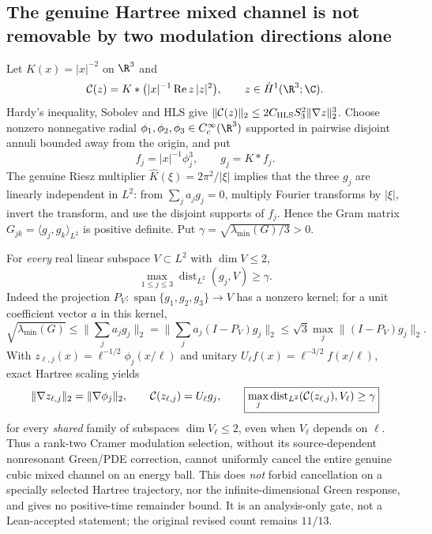 \subsection*{The genuine Hartree mixed channel is not removable by two modulation directions alone}

Let \(K(x)=|x|^{-2}\) on \(\R^3\) and
\[
 {\cal C}(z)=K*\bigl(|x|^{-1}\operatorname{Re}z\,|z|^2\bigr),
 \qquad z\in\dot H^1(\R^3;\C).
\]
Hardy's inequality, Sobolev and HLS give
\(\|{\cal C}(z)\|_2\le 2C_{\rm HLS}S_3^2\|\nabla z\|_2^3\).
Choose nonzero nonnegative radial \(\phi_1,\phi_2,\phi_3\in C_c^\infty(\R^3)\)
supported in pairwise disjoint annuli bounded away from the origin, and put
\[
 f_j=|x|^{-1}\phi_j^3,\qquad g_j=K*f_j.
\]
The genuine Riesz multiplier \(\widehat K(\xi)=2\pi^2/|\xi|\)
implies that the three \(g_j\) are linearly independent in \(L^2\):
from \(\sum_j a_jg_j=0\), multiply Fourier transforms by \(|\xi|\),
invert the transform, and use the disjoint supports of \(f_j\).
Hence the Gram matrix \(G_{jk}=\langle g_j,g_k\rangle_{L^2}\)
is positive definite. Put \(\gamma=\sqrt{\lambda_{\min}(G)/3}>0\).

For \emph{every} real linear subspace \(V\subset L^2\) with \(\dim V\le2\),
\[
 \boxed{\max_{1\le j\le3}\operatorname{dist}_{L^2}(g_j,V)\ge\gamma.}
\]
Indeed the projection \(P_V:\operatorname{span}\{g_1,g_2,g_3\}\to V\)
has a nonzero kernel; for a unit coefficient vector \(a\) in this
kernel,
\[
 \sqrt{\lambda_{\min}(G)}
 \le\|\sum_j a_jg_j\|_2
 =\|\sum_j a_j(I-P_V)g_j\|_2
 \le\sqrt3\max_j\|(I-P_V)g_j\|_2.
\]
With \(z_{\ell,j}(x)=\ell^{-1/2}\phi_j(x/\ell)\) and unitary
\(U_\ell f(x)=\ell^{-3/2}f(x/\ell)\), exact Hartree scaling yields
\[
 \|\nabla z_{\ell,j}\|_2=\|\nabla\phi_j\|_2,\qquad
 {\cal C}(z_{\ell,j})=U_\ell g_j,\qquad
 \boxed{\max_j\operatorname{dist}_{L^2}
   ({\cal C}(z_{\ell,j}),V_\ell)\ge\gamma}
\]
for every \emph{shared} family of subspaces \(\dim V_\ell\le2\),
even when \(V_\ell\) depends on \(\ell\).
Thus a rank-two Cramer modulation selection, without its
source-dependent nonresonant Green/PDE correction, cannot uniformly
cancel the entire genuine cubic mixed channel on an energy ball.
This does \emph{not} forbid cancellation on a specially selected
Hartree trajectory, nor the infinite-dimensional Green response,
and gives no positive-time remainder bound.
It is an analysis-only gate, not a Lean-accepted statement;
the original revised count remains \(11/13\).

